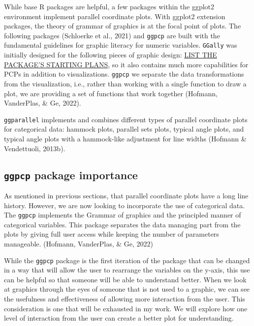 \documentclass[print]{nuthesis}
\begin{document}
While base R packages are helpful, a few packages within the ggplot2 environment implement parallel coordinate plots. With ggplot2 extension packages, the theory of grammar of graphics is at the focal point of plots. The following packages (Schloerke et al., 2021) and \texttt{ggpcp} are built with the fundamental guidelines for graphic literacy for numeric variables. \texttt{GGally} was initially designed for the following pieces of graphic design: \href{}{LIST THE PACKAGE'S STARTING PLANS}, so it also contains much more capabilities for PCPs in addition to visualizations. \texttt{ggpcp} we separate the data transformations from the visualization, i.e., rather than working with a single function to draw a plot, we are providing a set of functions that work together (Hofmann, VanderPlas, \& Ge, 2022).

\texttt{ggparallel} implements and combines different types of parallel coordinate plots for categorical data: hammock plots, parallel sets plots, typical angle plots, and typical angle plots with a hammock-like adjustment for line widths (Hofmann \& Vendettuoli, 2013b).

\hypertarget{ggpcp-package-importance}{%
\subsection{\texorpdfstring{\texttt{ggpcp} package importance}{ggpcp package importance}}\label{ggpcp-package-importance}}

As mentioned in previous sections, that parallel coordinate plots have a long line history. However, we are now looking to incorporate the use of categorical data. The \texttt{ggpcp} implements the Grammar of graphics and the principled manner of categorical variables. This package separates the data managing part from the plots by giving full user access while keeping the number of parameters manageable. (Hofmann, VanderPlas, \& Ge, 2022)

While the \texttt{ggpcp} package is the first iteration of the package that can be changed in a way that will allow the user to rearrange the variables on the y-axis, this use can be helpful so that someone will be able to understand better. When we look at graphics through the eyes of someone that is not used to a graphic, we can see the usefulness and effectiveness of allowing more interaction from the user. This consideration is one that will be exhausted in my work. We will explore how one level of interaction from the user can create a better plot for understanding.
\end{document}
